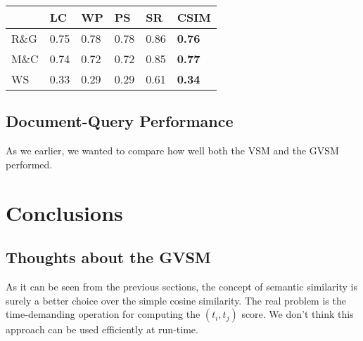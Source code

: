 \documentclass[letterpaper, 10 pt, conference]{ieeeconf}  %
\begin{document}
\begin{table}[h]
\centering
\begin{tabular}{l|l|l|l|l|l}
     & LC   & WP   & PS   & SR   & \textbf{CSIM} \\ \hline
R\&G & 0.75 & 0.78 & 0.78 & 0.86 & \textbf{0.76} \\ \hline
M\&C & 0.74 & 0.72 & 0.72 & 0.85 & \textbf{0.77} \\ \hline
WS   & 0.33 & 0.29 & 0.29 & 0.61 & \textbf{0.34}
\end{tabular}
\end{table}
\subsection{Document-Query Performance}
As we earlier, we wanted to compare how well both the VSM and the GVSM performed. 
\section{Conclusions}
\subsection{Thoughts about the GVSM}
As it can be seen from the previous sections, the concept of semantic similarity is surely a better choice over the simple cosine similarity. The real problem is the time-demanding operation for computing the $(t_i,t_j)$ score. We don't think this approach can be used efficiently at run-time. 
\end{document}
